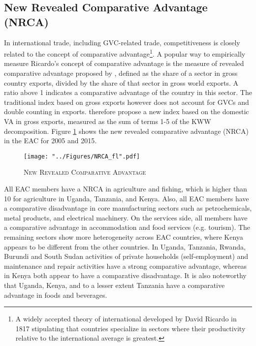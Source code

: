 \documentclass[a4paper]{article}
\begin{document}
\subsection{New Revealed Comparative Advantage (NRCA)}

In international trade, including GVC-related trade, competitiveness is closely related to the concept of comparative advantage\footnote{A widely accepted theory of international developed by David Ricardo in 1817 stipulating that countries specialize in sectors where their productivity relative to the international average is greatest.}. 
A popular way to empirically measure Ricardo's concept of comparative advantage is the measure of revealed comparative advantage proposed by \citet{balassa1965trade}, defined as the share of a sector in gross country exports, divided by the share of that sector in gross world exports. A ratio above 1 indicates a comparative advantage of the country in this sector. The traditional index based on gross exports however does not account for GVCs and double counting in exports. \citet{koopman2014tracing} therefore propose a new index based on the domestic VA in gross exports, measured as the sum of terms 1-5 of the KWW decomposition. Figure \ref{fig:NRCA} shows the new revealed comparative advantage (NRCA) in the EAC for 2005 and 2015.

\begin{figure}[h!]
\centering
\caption{\label{fig:NRCA}\textsc{New Revealed Comparative Advantage}}
\texttt{[image: "../Figures/NRCA\_fl".pdf]} %
\end{figure}
\FloatBarrier

 All EAC members have a NRCA in agriculture and fishing, which is higher than 10 for agriculture in Uganda, Tanzania, and Kenya. Also, all EAC members have a comparative disadvantage in core manufacturing sectors such as petrochemicals, metal products, and electrical machinery. On the services side, all members have a comparative advantage in accommodation and food services (e.g. tourism). The remaining sectors show more heterogeneity across EAC countries, where Kenya appears to be different from the other countries. In Uganda, Tanzania, Rwanda, Burundi and South Sudan activities of private households (self-employment) and maintenance and repair activities have a strong comparative advantage, whereas in Kenya both appear to have a comparative disadvantage. It is also noteworthy that Uganda, Kenya, and to a lesser extent Tanzania have a comparative advantage in foods and beverages. \newline
\end{document}
